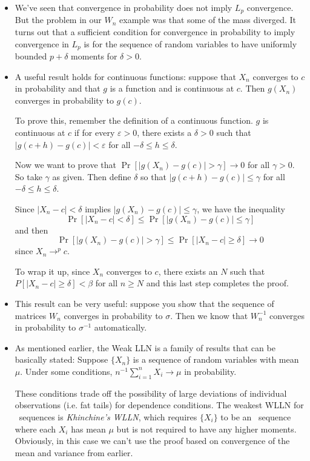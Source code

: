 \begin{itemize}
\item We've seen that convergence in probability does not imply $L_p$
  convergence.  But the problem in our $W_n$ example was that some of
  the mass diverged.  It turns out that a sufficient condition for
  convergence in probability to imply convergence in $L_p$ is for the
  sequence of random variables to have uniformly bounded $p + δ$
  moments for $δ > 0$.

\item A useful result holds for continuous functions: suppose that
  $X_n$ converges to $c$ in probability and that $g$ is a function and
  is continuous at $c$.  Then $g(X_n)$ converges in probability to
  $g(c)$.

  To prove this, remember the definition of a continuous function.
  $g$ is continuous at $c$ if for every $ε >0$, there exists a $δ > 0$
  such that $|g(c + h) - g(c)| < ε$ for all $-δ ≤ h ≤ δ$.

  Now we want to prove that $\Pr[|g(X_n) - g(c)| > γ] → 0$ for all $γ
  > 0$.  So take $γ$ as given.  Then define $δ$ so that $|g(c + h) -
  g(c)| ≤ γ$ for all $-δ ≤ h ≤ δ$.

  Since $|X_n - c| < δ$ implies $|g(X_n) - g(c)| ≤ γ$, we have the
  inequality
  \begin{equation*}
    \Pr[ |X_n - c| < δ] ≤ \Pr[ |g(X_n) - g(c)| ≤ γ ]
  \end{equation*}
  and then
  \begin{equation*}
    \Pr[|g(X_n) - g(c)| > γ] ≤ \Pr[|X_n - c| ≥ δ] → 0
  \end{equation*}
  since $X_n →^p c$.

  To wrap it up, since $X_n$ converges to $c$, there exists an $N$
  such that $P[|X_n - c| ≥ δ] < β$ for all $n ≥ N$ and this last step
  completes the proof.

\item This result can be very useful: suppose you show that the
  sequence of matrices $W_n$ converges in probability to $σ$.  Then we
  know that $W_n^{-1}$ converges in probability to $σ^{-1}$ automatically.


\item As mentioned earlier, the Weak LLN is a family of results that
  can be basically stated: Suppose $\{X_n\}$ is a sequence of random
  variables with mean $μ$.  Under some conditions, $n^{-1} ∑_{i=1}^n
  X_i → μ$ in probability.

  These conditions trade off the possibility of large deviations of
  individual observations (i.e. fat tails) for dependence conditions.
  The weakest WLLN for \iid\ sequences is \emph{Khinchine's WLLN},
  which requires $\{X_i\}$ to be an \iid\ sequence where each $X_i$
  has mean $μ$ but is not required to have any higher moments.
  Obviously, in this case we can't use the proof based on convergence
  of the mean and variance from earlier.


\end{itemize}
